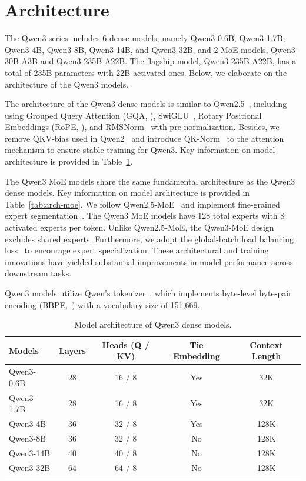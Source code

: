 \section{Architecture}

The Qwen3 series includes 6 dense models, namely Qwen3-0.6B, Qwen3-1.7B, Qwen3-4B, Qwen3-8B, Qwen3-14B, and Qwen3-32B, and 2 MoE models, Qwen3-30B-A3B and Qwen3-235B-A22B. The flagship model, Qwen3-235B-A22B, has a total of 235B parameters with 22B activated ones. Below, we elaborate on the architecture of the Qwen3 models.

The architecture of the Qwen3 dense models is similar to Qwen2.5~\citep{qwen2.5}, including using Grouped Query Attention (GQA, \citealp{gqa}), SwiGLU~\citep{glu}, Rotary Positional Embeddings (RoPE, \citealp{rope}), and RMSNorm~\citep{rmsnorm} with pre-normalization. Besides, we remove QKV-bias used in Qwen2~\citep{qwen2} and introduce QK-Norm~\citep{pmlr-v202-dehghani23a} to the attention mechanism to ensure stable training for Qwen3. Key information on model architecture is provided in Table~\ref{tab:arch-dense}.

The Qwen3 MoE models share the same fundamental architecture as the Qwen3 dense models. 
Key information on model architecture is provided in Table~\ref{tab:arch-moe}. 
We follow Qwen2.5-MoE~\citep{qwen2.5} and implement fine-grained expert segmentation~\citep{deepseekmoe}. 
The Qwen3 MoE models have 128 total experts with 8 activated experts per token.
Unlike Qwen2.5-MoE, the Qwen3-MoE design excludes shared experts.
Furthermore, we adopt the global-batch load balancing loss~\citep{global_balance} to encourage expert specialization.
These architectural and training innovations have yielded substantial improvements in model performance across downstream tasks. 


Qwen3 models utilize Qwen's tokenizer~\citep{qwen}, which implements byte-level byte-pair encoding (BBPE,~\citealp{gpt3,wang2020neural,sennirch2016neural}) with a vocabulary size of 151,669.

\begin{table}[htbp]
\caption{Model architecture of Qwen3 dense models.\label{tab:arch-dense}}
\small
\centering
\begin{tabular}{@{}lcccc@{}} 
\toprule
Models  & Layers & Heads (Q / KV) & Tie Embedding & Context Length  \\
\midrule
Qwen3-0.6B  & 28 & 16 / 8 & Yes & 32K   \\
Qwen3-1.7B  & 28 & 16 / 8 & Yes & 32K   \\
Qwen3-4B  & 36 & 32 / 8 & Yes & 128K  \\
Qwen3-8B  & 36 & 32 / 8 & No & 128K  \\
Qwen3-14B & 40 & 40 / 8 & No & 128K  \\
Qwen3-32B & 64 & 64 / 8 & No & 128K  \\
\bottomrule
\end{tabular}
\end{table}

